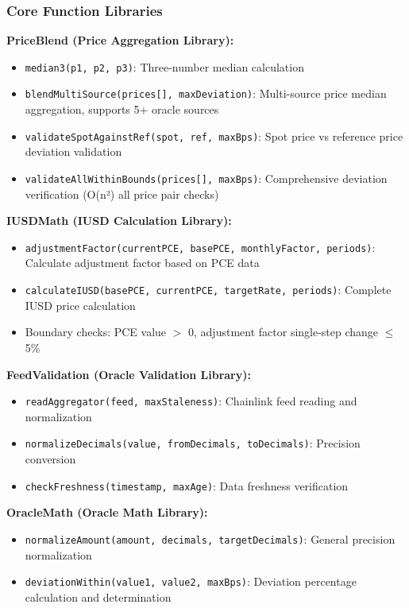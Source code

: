 \documentclass{article}
\begin{document}
\subsubsection{Core Function Libraries}

\textbf{PriceBlend (Price Aggregation Library):}
\begin{itemize}
  \item \texttt{median3(p1, p2, p3)}: Three-number median calculation
  \item \texttt{blendMultiSource(prices[], maxDeviation)}: Multi-source price median aggregation, supports 5+ oracle sources
  \item \texttt{validateSpotAgainstRef(spot, ref, maxBps)}: Spot price vs reference price deviation validation
  \item \texttt{validateAllWithinBounds(prices[], maxBps)}: Comprehensive deviation verification (O(n²) all price pair checks)
\end{itemize}

\textbf{IUSDMath (IUSD Calculation Library):}
\begin{itemize}
  \item \texttt{adjustmentFactor(currentPCE, basePCE, monthlyFactor, periods)}: Calculate adjustment factor based on PCE data
  \item \texttt{calculateIUSD(basePCE, currentPCE, targetRate, periods)}: Complete IUSD price calculation
  \item Boundary checks: PCE value $>$ 0, adjustment factor single-step change $\leq$ 5\%
\end{itemize}

\textbf{FeedValidation (Oracle Validation Library):}
\begin{itemize}
  \item \texttt{readAggregator(feed, maxStaleness)}: Chainlink feed reading and normalization
  \item \texttt{normalizeDecimals(value, fromDecimals, toDecimals)}: Precision conversion
  \item \texttt{checkFreshness(timestamp, maxAge)}: Data freshness verification
\end{itemize}

\textbf{OracleMath (Oracle Math Library):}
\begin{itemize}
  \item \texttt{normalizeAmount(amount, decimals, targetDecimals)}: General precision normalization
  \item \texttt{deviationWithin(value1, value2, maxBps)}: Deviation percentage calculation and determination
\end{itemize}
\end{document}
